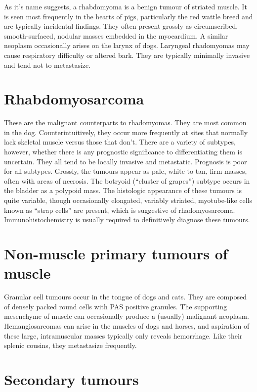 \documentclass[openany]{book}
\begin{document}
As it's name suggests, a rhabdomyoma is a benign tumour of striated
muscle. It is seen most frequently in the hearts of pigs, particularly
the red wattle breed and are typically incidental findings. They often
present grossly as circumscribed, smooth-surfaced, nodular masses
embedded in the myocardium. A similar neoplasm occasionally arises on
the larynx of dogs. Laryngeal rhadomyomas may cause respiratory
difficulty or altered bark. They are typically minimally invasive and
tend not to metastasize.

\section{Rhabdomyosarcoma}\label{rhabdomyosarcoma}

These are the malignant counterparts to rhadomyomas. They are most
common in the dog. Counterintuitively, they occur more frequently at
sites that normally lack skeletal muscle versus those that don't. There
are a variety of subtypes, however, whether there is any prognostic
significance to differentiating them is uncertain. They all tend to be
locally invasive and metastatic. Prognosis is poor for all subtypes.
Grossly, the tumours appear as pale, white to tan, firm masses, often
with areas of necrosis. The botryoid (``cluster of grapes'') subtype
occurs in the bladder as a polypoid mass. The histologic appearance of
these tumours is quite variable, though occasionally elongated, variably
striated, myotube-like cells known as ``strap cells'' are present, which
is suggestive of rhadomyosarcoma. Immunohistochemistry is usually
required to definitively diagnose these tumours.

\section{Non-muscle primary tumours of
muscle}\label{non-muscle-primary-tumours-of-muscle}

Granular cell tumours occur in the tongue of dogs and cats. They are
composed of densely packed round cells with PAS positive granules. The
supporting mesenchyme of muscle can occasionally produce a (usually)
malignant neoplasm. Hemangiosarcomas can arise in the muscles of dogs
and horses, and aspiration of these large, intramuscular masses
typically only reveals hemorrhage. Like their splenic cousins, they
metastasize frequently.

\section{Secondary tumours}\label{secondary-tumours}
\end{document}
